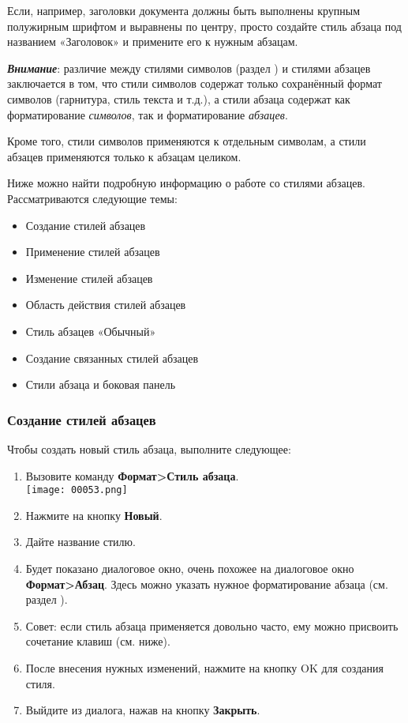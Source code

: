 ﻿\documentclass[a4paper,10pt]{article}
\begin{document}
Если, например, заголовки документа должны быть выполнены крупным полужирным шрифтом и выравнены по центру, просто создайте стиль абзаца под названием «Заголовок» и примените его к нужным абзацам.

\textbf{\textit{Внимание}}: различие между стилями символов (раздел ) и стилями абзацев заключается в том, что стили символов содержат только сохранённый формат символов (гарнитура, стиль текста и т.д.), а стили абзаца содержат как форматирование \textit{символов}, так и форматирование \textit{абзацев}.

Кроме того, стили символов применяются к отдельным символам, а стили абзацев применяются только к абзацам целиком.

Ниже можно найти подробную информацию о работе со стилями абзацев. Рассматриваются следующие темы:
\begin{itemize}
 \item Создание стилей абзацев
 \item Применение стилей абзацев
 \item Изменение стилей абзацев
 \item Область действия стилей абзацев
 \item Стиль абзацев «Обычный»
 \item Создание связанных стилей абзацев
 \item Стили абзаца и боковая панель
\end{itemize}

\subsubsection{Создание стилей абзацев}
Чтобы создать новый стиль абзаца, выполните следующее:
\begin{enumerate}
 \item Вызовите команду \textbf{Формат>Стиль абзаца}.\\
 \texttt{[image: 00053.png]}
 \item Нажмите на кнопку \textbf{Новый}.
 \item Дайте название стилю.
 \item Будет показано диалоговое окно, очень похожее на диалоговое окно \textbf{Формат>Абзац}. Здесь можно указать нужное форматирование абзаца (см. раздел ).
 \item Совет: если стиль абзаца применяется довольно часто, ему можно присвоить сочетание клавиш (см. ниже).
 \item После внесения нужных изменений, нажмите на кнопку OK для создания стиля.
 \item Выйдите из диалога, нажав на кнопку \textbf{Закрыть}.
\end{enumerate}
\end{document}
